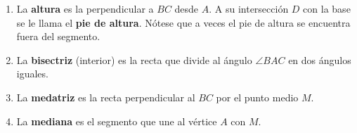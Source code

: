 \begin{definicion}  
\begin{enumerate}
    \item La {\bf altura} es la perpendicular a $BC$ desde $A$. A su intersección $D$ con la base se le llama el {\bf pie de altura}. Nótese que a veces el pie de altura se encuentra fuera del segmento.
    \item La {\bf bisectriz} (interior) es la recta que divide al ángulo $\angle BAC$ en dos ángulos iguales. 
    \item La {\bf medatriz} es la recta perpendicular al $BC$ por el punto medio $M$. 
    \item La {\bf mediana} es el segmento que une al vértice $A$ con $M$.
\end{enumerate}
\end{definicion}

